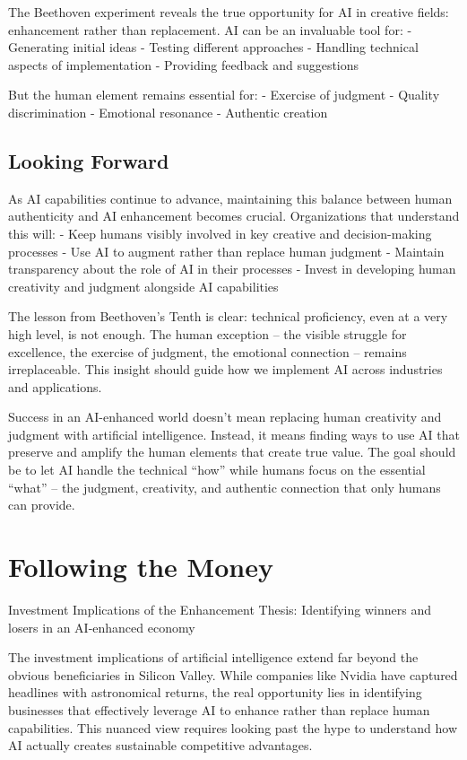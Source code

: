 \documentclass[
  Letterpaper,
]{scrbook}
\begin{document}
The Beethoven experiment reveals the true opportunity for AI in creative
fields: enhancement rather than replacement. AI can be an invaluable
tool for: - Generating initial ideas - Testing different approaches -
Handling technical aspects of implementation - Providing feedback and
suggestions

But the human element remains essential for: - Exercise of judgment -
Quality discrimination - Emotional resonance - Authentic creation

\section{Looking Forward}\label{looking-forward}

As AI capabilities continue to advance, maintaining this balance between
human authenticity and AI enhancement becomes crucial. Organizations
that understand this will: - Keep humans visibly involved in key
creative and decision-making processes - Use AI to augment rather than
replace human judgment - Maintain transparency about the role of AI in
their processes - Invest in developing human creativity and judgment
alongside AI capabilities

The lesson from Beethoven's Tenth is clear: technical proficiency, even
at a very high level, is not enough. The human exception -- the visible
struggle for excellence, the exercise of judgment, the emotional
connection -- remains irreplaceable. This insight should guide how we
implement AI across industries and applications.

Success in an AI-enhanced world doesn't mean replacing human creativity
and judgment with artificial intelligence. Instead, it means finding
ways to use AI that preserve and amplify the human elements that create
true value. The goal should be to let AI handle the technical ``how''
while humans focus on the essential ``what'' -- the judgment,
creativity, and authentic connection that only humans can provide.


\chapter{Following the Money}\label{following-the-money}

Investment Implications of the Enhancement Thesis: Identifying winners
and losers in an AI-enhanced economy

\hfill\break

The investment implications of artificial intelligence extend far beyond
the obvious beneficiaries in Silicon Valley. While companies like Nvidia
have captured headlines with astronomical returns, the real opportunity
lies in identifying businesses that effectively leverage AI to enhance
rather than replace human capabilities. This nuanced view requires
looking past the hype to understand how AI actually creates sustainable
competitive advantages.
\end{document}
